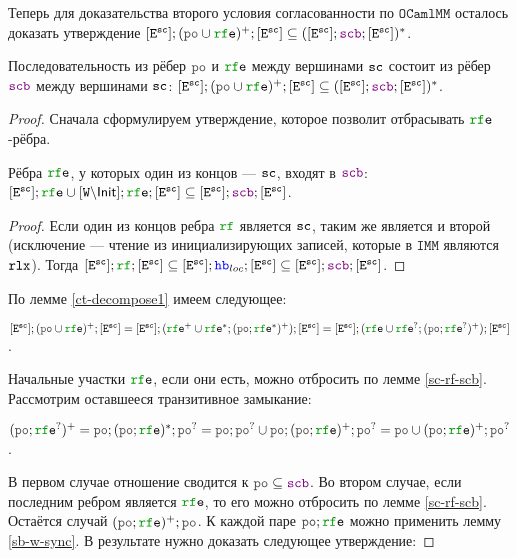 \documentclass[14pt]{matmex-diploma-custom}
\newcommand{\IMM}{\mathtt{IMM}}
\newcommand{\OMM}{\mathtt{OCaml}\allowbreak \mathtt{MM}}
\begin{document}
Теперь для доказательства второго условия согласованности по $\OMM$ осталось доказать утверждение $[\lE^{\sco}];(\lPO \cup \lRFE)^{+} ; [\lE^{\sco}] \subseteq ([\lE^\sco] ; \lSCB ; [\lE^\sco])^{*}$. 

\begin{theorem} \label{sc-po-rfe-pscb}
  Последовательность из рёбер $\lPO$ и $\lRFE$ между вершинами ${\mathtt{sc}}$ состоит из рёбер $\lSCB$ между вершинами ${\mathtt{sc}}$: $[\lE^{\sco}];(\lPO \cup \lRFE)^{+} ; [\lE^{\sco}] \subseteq ([\lE^\sco] ; \lSCB ; [\lE^\sco])^{*}$.
\end{theorem}
\begin{proof}

  Сначала сформулируем утверждение, которое позволит отбрасывать $\lRFE$-рёбра. 

  \begin{lemma} \label{sc-rf-scb}
    Рёбра $\lRFE$, у которых один из концов --- ${\mathtt{sc}}$, входят в $\lSCB$: $[\lE^{\sco}];\lRFE \cup [\lW\backslash \Init];\lRFE;[\lE^{\sco}] \subseteq [\lE^\sco] ; \lSCB ; [\lE^\sco]$. 
  \end{lemma}
  \begin{proof}    
    Если один из концов ребра $\lRF$ является ${\mathtt{sc}}$, таким же является и второй (исключение --- чтение из инициализирующих записей, которые в $\IMM$ являются $\mathtt{rlx}$).
    Тогда $[\lE^{\sco}];\lRF;[\lE^{\sco}] \subseteq [\lE^{\sco}];\lHB_{loc};[\lE^{\sco}] \subseteq [\lE^{\sco}];\lSCB;[\lE^{\sco}]$.
  \end{proof}
  
  По лемме \ref{ct-decompose1} имеем следующее:

  $[\lE^{\sco}];(\lPO \cup \lRFE)^{+};[\lE^{\sco}] = [\lE^{\sco}];(\lRFE^{+} \cup \lRFE^{*} ; (\lPO ; \lRFE^{*})^{+});[\lE^{\sco}]=[\lE^{\sco}];(\lRFE \cup \lRFE^{?} ; (\lPO ; \lRFE^{?})^{+}); [\lE^{\sco}]$.

  Начальные участки $\lRFE$, если они есть, можно отбросить по лемме \ref{sc-rf-scb}. Рассмотрим оставшееся транзитивное замыкание:

  $(\lPO ; \lRFE^{?})^{+} = \lPO; (\lPO ; \lRFE)^{*} ; \lPO^? = \lPO; \lPO^{?} \cup \lPO; (\lPO ; \lRFE)^{+};\lPO^? = \lPO \cup (\lPO ; \lRFE)^{+};\lPO^?$. 

  В первом случае отношение сводится к  $\lPO \subseteq \lSCB$. Во втором случае, если последним ребром является $\lRFE$, то его можно отбросить по лемме \ref{sc-rf-scb}. Остаётся случай $(\lPO ; \lRFE)^{+} ; \lPO$. К каждой паре $\lPO ; \lRFE$ можно применить лемму \ref{sb-w-sync}. В результате нужно доказать следующее утверждение:


\end{proof}
\end{document}

